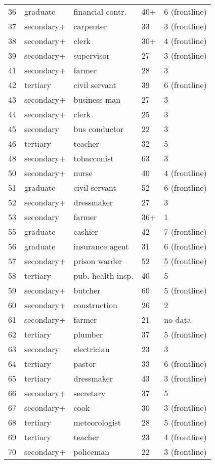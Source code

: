 \begin{longtable}{rllll}
36 & graduate & financial contr. & 40+ & 6 (frontline)\\
37 & secondary+ & carpenter & 33 & 3 (frontline)\\
38 & secondary+ & clerk & 30+ & 4 (frontline)\\
39 & secondary+ & supervisor & 27 & 3 (frontline)\\
41 & secondary+ & farmer & 28 & 3 \\
42 & tertiary & civil servant & 39 & 6 (frontline)\\
43 & secondary+ & business man & 27 & 3 \\
44 & secondary+ & clerk & 25 & 3 \\
45 & secondary & bus conductor & 22 & 3\\
46 & tertiary & teacher & 32 & 5 \\
48 & secondary+ & tobacconist & 63 & 3 \\
50 & secondary+ & nurse & 40 & 4 (frontline)\\
51 & graduate & civil servant & 52 & 6 (frontline) \\
52 & secondary+ & dressmaker & 27 & 3 \\
53 & secondary & farmer & 36+ & 1\\
55 & graduate & cashier & 42 & 7 (frontline)\\
56 & graduate & insurance agent & 31 & 6 (frontline)\\
57 & secondary+ & prison warder & 52 & 5 (frontline)\\
58 & tertiary & pub. health insp. & 40 & 5\\
59 & secondary+ & butcher & 60 & 5 (frontline)\\
60 & secondary+ & construction & 26 & 2 \\
61 & secondary+ & farmer & 21 & no data\\
62 & tertiary & plumber & 37 & 5 (frontline)\\
63 & secondary & electrician & 23 & 3 \\
64 & tertiary & pastor & 33 & 6 (frontline)\\
65 & tertiary & dressmaker & 43 & 3 (frontline)\\
66 & secondary+ & secretary & 37 & 5\\
67 & secondary+ & cook & 30 & 3 (frontline)\\
68 & tertiary & meteorologist & 28 & 5 (frontline)\\
69 & tertiary & teacher & 23 & 4 (frontline)\\
70 & secondary+ & policeman & 22 & 3 (frontline)\\

\end{longtable}
